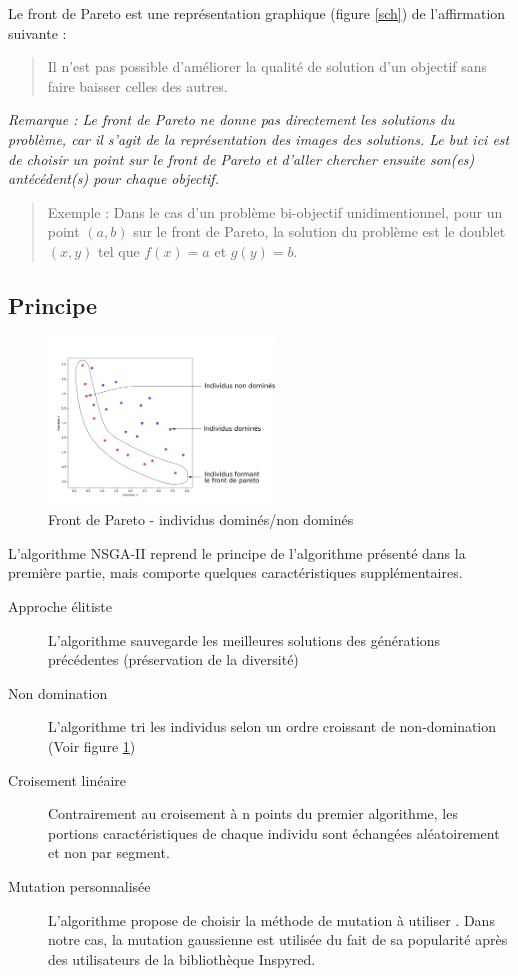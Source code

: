 \documentclass[12pt]{report}
\begin{document}
    Le front de Pareto est une représentation graphique (figure \ref{sch}) de l'affirmation suivante :
    \begin{quotation}
      Il n'est pas possible d'améliorer la qualité de solution d'un objectif sans faire baisser celles des autres.
    \end{quotation}

    \emph{Remarque : Le front de Pareto ne donne pas directement les solutions du problème, car il s'agit de la représentation des images des solutions. Le but ici est de choisir un point sur le front de Pareto et d'aller chercher ensuite son(es) antécédent(s) pour chaque objectif.}

    \begin{quotation}
      Exemple : Dans le cas d'un problème bi-objectif unidimentionnel, pour un point $(a,b)$ sur le front de Pareto, la solution du problème est le doublet $(x,y)$ tel que $f(x)=a$ et $g(y)=b$.
    \end{quotation}



      \subsection{Principe}
      \begin{figure}
        \centering
        \includegraphics[width=6cm]{img/Pareto_domine.png}
        \caption{Front de Pareto - individus dominés/non dominés}
        \label{non_domine}
      \end{figure}
      L'algorithme NSGA-II reprend le principe de l'algorithme présenté dans la première partie, mais comporte quelques caractéristiques supplémentaires.


      \begin{description}
        \item [Approche élitiste] L'algorithme sauvegarde les meilleures solutions des générations précédentes (préservation de la diversité)
        \item [Non domination] L'algorithme tri les individus selon un ordre croissant de non-domination (Voir figure \ref{non_domine})
        \item [Croisement linéaire] Contrairement au croisement à n points du premier algorithme, les portions caractéristiques de chaque individu sont échangées aléatoirement et non par segment.
        \item [Mutation personnalisée] L'algorithme propose de choisir la méthode de mutation à utiliser \cite{wiki6}. Dans notre cas, la mutation gaussienne est utilisée du fait de sa popularité après des utilisateurs de la bibliothèque Inspyred.
      \end{description}
\end{document}
